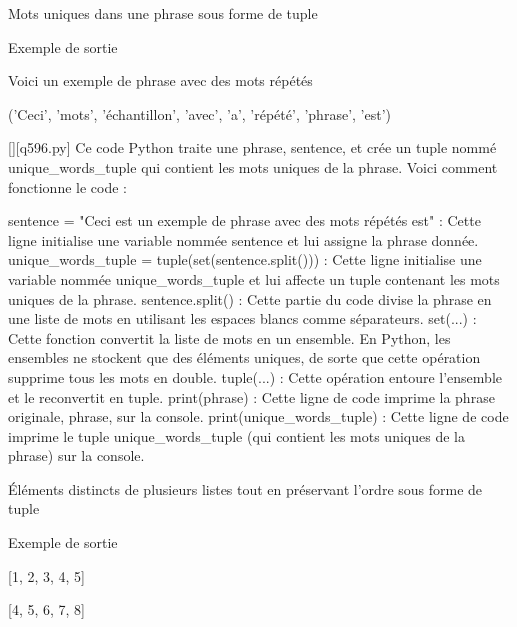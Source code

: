         \question
        Mots uniques dans une phrase sous forme de tuple

Exemple de sortie

Voici un exemple de phrase avec des mots répétés

('Ceci', 'mots', 'échantillon', 'avec', 'a', 'répété', 'phrase', 'est')
        \par
        \begin{solution}
            \renewcommand{\nomfichier}{q596.py}
            \pythonfile{\chemincode \nomfichier}[][\nomfichier]
            Ce code Python traite une phrase, sentence, et crée un tuple nommé unique\_words\_tuple qui contient les mots uniques de la phrase. Voici comment fonctionne le code :

    sentence = "Ceci est un exemple de phrase avec des mots répétés est" : Cette ligne initialise une variable nommée sentence et lui assigne la phrase donnée.
    unique\_words\_tuple = tuple(set(sentence.split())) : Cette ligne initialise une variable nommée unique\_words\_tuple et lui affecte un tuple contenant les mots uniques de la phrase.
        sentence.split() : Cette partie du code divise la phrase en une liste de mots en utilisant les espaces blancs comme séparateurs.
        set(...) : Cette fonction convertit la liste de mots en un ensemble. En Python, les ensembles ne stockent que des éléments uniques, de sorte que cette opération supprime tous les mots en double.
        tuple(...) : Cette opération entoure l'ensemble et le reconvertit en tuple.
    print(phrase) : Cette ligne de code imprime la phrase originale, phrase, sur la console.
    print(unique\_words\_tuple) : Cette ligne de code imprime le tuple unique\_words\_tuple (qui contient les mots uniques de la phrase) sur la console.
        \end{solution}
        

        \question
        Éléments distincts de plusieurs listes tout en préservant l'ordre sous forme de tuple

Exemple de sortie

[1, 2, 3, 4, 5]

[4, 5, 6, 7, 8]

